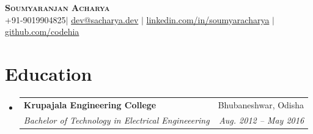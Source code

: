 \documentclass[letterpaper,11pt]{article}
\makeatletter
\newcommand{\resumeSubheading}[4]{\vspace{-2pt}\item\begin{tabular*}{0.97\textwidth}[t]{l@{\extracolsep{\fill}}r}\textbf{#1} & #2 \\\textit{\small#3} & \textit{\small #4} \\\end{tabular*}\vspace{-7pt}}
\newcommand{\resumeSubHeadingListStart}{\begin{itemize}[leftmargin=0.15in, label={}]}
\newcommand{\resumeSubHeadingListEnd}{\end{itemize}}
\makeatother
\begin{document}
\begin{center}
    \textbf{\Huge \scshape Soumyaranjan Acharya} \\ \vspace{1pt}
    \small +91-9019904825$|$ \href{mailto:dev@sacharya.com}{dev@sacharya.dev} $|$ 
    \href{https://linkedin.com/in/soumyaracharya}{linkedin.com/in/soumyaracharya} $|$
    \href{https://github.com/codehia}{github.com/codehia}
\end{center}

\section{Education}
  \resumeSubHeadingListStart
    \resumeSubheading
      {Krupajala Engineering College}{Bhubaneshwar, Odisha}
      {Bachelor of Technology in Electrical Engineeering}{Aug. 2012 -- May 2016}
  \resumeSubHeadingListEnd
\end{document}
